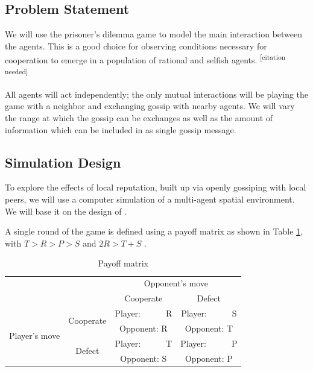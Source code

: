 \documentclass[english]{article}
\newcommand{\citationneeded}{\textsuperscript{\color{blue} [citation needed]}}
\begin{document}
\subsection{Problem Statement}
We will use the prisoner's dilemma game to model the main interaction between the agents. This is a good choice for observing conditions necessary for cooperation to emerge in a population of rational and selfish agents.
\citationneeded

All agents will act independently; the only mutual interactions will be playing the game with a neighbor and exchanging gossip with nearby agents.
We will vary the range at which the gossip can be exchanges as well as the amount of information which can be included in as single gossip message.

\subsection{Simulation Design}

To explore the effects of local reputation, built up via openly gossiping with local peers, we will use a computer simulation of a multi-agent spatial environment. We will base it on the design of \citet{smaldino}.


A single round of the game is defined using a payoff matrix as shown in Table \ref{table:payoff}, with $T > R > P > S$ and $2R > T + S$ \citep{chammah1965}.

\begin{table}[h!]
  \centering
  \begin{tabular}{c c||c|c}
    & & \multicolumn{2}{c}{Opponent's move} \\
    & & Cooperate & Defect \\
    \hline\hline

    \multirow{4}{6em}{Player's move}
    & \multirow{2}{5em}{Cooperate}
      & Player:\ \ \ \ \ \ R & Player:\ \ \ \ \ \ S \\
    & & Opponent: R & Opponent: T \\
    \cline{2-4}
    & \multirow{2}{5em}{Defect}
      & Player:\ \ \ \ \ \ T & Player:\ \ \ \ \ \ P \\
    & & Opponent: S & Opponent: P \\
  \end{tabular}

  \caption{Payoff matrix}
  \label{table:payoff}
\end{table}
\end{document}
